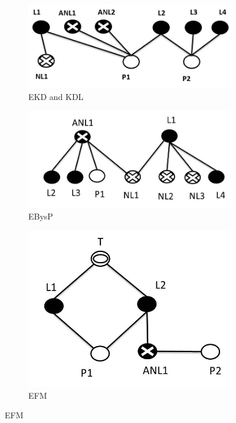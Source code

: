 \documentclass[prodmode,acmtecs]{acmsmall} %
\begin{document}
\begin{figure}
\centering
\begin{subfigure}{.4\textwidth}
\centering
\includegraphics[width=\linewidth]{NL_BASE.jpg}%
\caption{EKD and KDL}\label{fig:NL_Heuristics}%
\end{subfigure}%
\begin{subfigure}{.35\textwidth}
  \centering
\includegraphics[width=\linewidth]{PROMISENL.jpg}%
  \caption{EBysP}
  \label{fig:PROMISENL}
\end{subfigure}%
\begin{subfigure}{.25\textwidth}
  \centering
\includegraphics[width=\linewidth]{fm.jpg}
  \caption{EFM}
  \label{fig:efm}
\end{subfigure}%


\end{figure}
\end{document}
